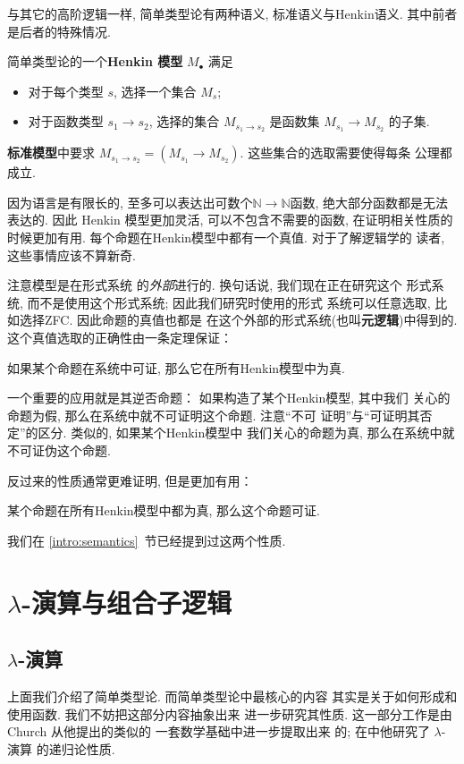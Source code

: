 与其它的高阶逻辑一样, 简单类型论有两种语义, 标准语义与Henkin语义.
其中前者是后者的特殊情况.

\begin{definition}
简单类型论的一个\textbf{Henkin 模型} \(M_\bullet\) 满足
\begin{itemize}
\item 对于每个类型 \(s\), 选择一个集合 \(M_s\);
\item 对于函数类型 \(s_1 \to s_2\), 选择的集合 \(M_{s_1 \to s_2}\)
是函数集 \(M_{s_1} \to M_{s_2}\) 的子集.
\end{itemize}
\textbf{标准模型}中要求 \(M_{s_1 \to s_2} =
(M_{s_1} \to M_{s_2})\). 这些集合的选取需要使得每条
公理都成立.
\end{definition}
因为语言是有限长的, 至多可以表达出可数个\(\mathbb N \to \mathbb N\)函数,
绝大部分函数都是无法表达的. 因此 Henkin 模型更加灵活,
可以不包含不需要的函数, 在证明相关性质的时候更加有用.
每个命题在Henkin模型中都有一个真值. 对于了解逻辑学的
读者, 这些事情应该不算新奇.

注意模型是在形式系统
的\emph{外部}进行的. 换句话说, 我们现在正在研究这个
形式系统, 而不是使用这个形式系统; 因此我们研究时使用的形式
系统可以任意选取, 比如选择ZFC. 因此命题的真值也都是
在这个外部的形式系统(也叫\textbf{元逻辑})中得到的.
这个真值选取的正确性由一条定理保证：
\begin{theorem}[Henkin可靠性]
如果某个命题在系统中可证, 那么它在所有Henkin模型中为真.
\end{theorem}
一个重要的应用就是其逆否命题：
如果构造了某个Henkin模型, 其中我们
关心的命题为假, 那么在系统中就不可证明这个命题. 注意“不可
证明”与“可证明其否定”的区分. 类似的, 如果某个Henkin模型中
我们关心的命题为真, 那么在系统中就不可证伪这个命题.

反过来的性质通常更难证明, 但是更加有用：
\begin{theorem}[Henkin完备性]
某个命题在所有Henkin模型中都为真, 那么这个命题可证.
\end{theorem}
我们在 \ref{intro:semantics}~节已经提到过这两个性质.

\section{\texorpdfstring{\(\lambda\)}{Lambda}-演算与组合子逻辑}
\subsection{\texorpdfstring{\(\lambda\)}{Lambda}-演算}\label{beginning:lambda}
上面我们介绍了简单类型论. 而简单类型论中最核心的内容
其实是关于如何形成和使用函数. 我们不妨把这部分内容抽象出来
进一步研究其性质. 这一部分工作是由 Church 从他提出的类似的
一套数学基础\cite{church:1932:untyped}中进一步提取出来
的; 在\cite{church:1936:lambda}中他研究了 \(\lambda\)-演算
的递归论性质.

